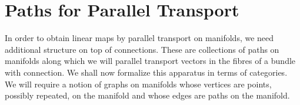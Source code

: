 \documentclass[\PRJWD/Thick_TQFTs_and_Quantum_Information.tex]{subfiles}
\begin{document}
\section{Paths for Parallel Transport}

In order to obtain linear maps by parallel transport on manifolds, we need
additional structure on top of connections. These are collections of paths on
manifolds along which we will parallel transport vectors in the fibres of a
bundle with connection. We shall now formalize this apparatus in terms of
categories. We will require a notion of graphs on manifolds whose vertices are
points, possibly repeated, on the manifold and whose edges are paths on the
manifold.










\end{document}
